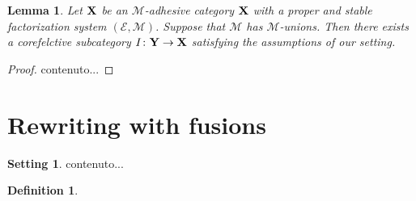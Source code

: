 \documentclass[a4paper]{article}
\def\X{\textbf {\textup{X}}}
\def\Y{\textbf {\textup{Y}}}
\newtheorem{lemma}[theorem]{Lemma}
\theoremstyle{definition}
\newtheorem{definition}[theorem]{Definition}
\newtheorem*{setting}{Setting}
\begin{document}
\begin{lemma}	
Let $\X$ be an $\mathcal{M}$-adhesive category $\X$  with a proper and stable factorization system $(\mathcal{E}, \mathcal{M})$. Suppose that $\mathcal{M}$ has $\mathcal{M}$-unions. Then there exists a corefelctive subcategory $I\colon \Y\to \X$ satisfying the assumptions of our setting.
\end{lemma}
\begin{proof}
	contenuto...
\end{proof}
\fi 

\section{Rewriting with fusions}
 
 \begin{setting}
 	contenuto...
 \end{setting}
 
\begin{definition}

\end{definition}




\end{document}
